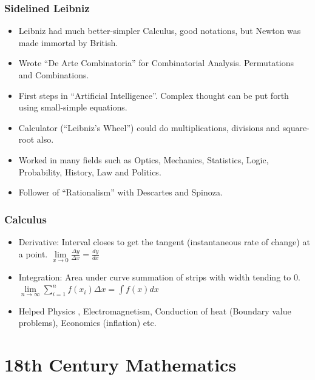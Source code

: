 \begin{frame}[fragile]
\frametitle{Sidelined Leibniz}
\begin{itemize}
\item Leibniz had much better-simpler Calculus, good notations, but Newton was made immortal by British.
\item Wrote ``De Arte Combinatoria'' for Combinatorial Analysis. Permutations and Combinations.
\item First steps in ``Artificial Intelligence''. Complex thought can be put forth using small-simple equations.
\item Calculator (``Leibniz's Wheel'') could do multiplications, divisions and square-root also.
\item Worked in many fields such as Optics, Mechanics, Statistics, Logic, Probability, History, Law and Politics.
\item Follower of ``Rationalism'' with Descartes and Spinoza.
\end{itemize}
\end{frame}

\begin{frame}[fragile]
\frametitle{Calculus}
\begin{itemize}
\item Derivative: Interval closes to get the tangent (instantaneous rate of change) at a point. $\lim \limits_{x \to 0} \frac{\Delta y}{\Delta x} = \frac{dy}{dx}$
\item Integration: Area under curve summation of strips with width tending to 0.
$\lim \limits_{n \to \infty} \sum^n_{i=1} f(x_i)\Delta x = \int f(x) dx$
\item Helped Physics , Electromagnetism, Conduction of heat (Boundary value problems), Economics (inflation) etc.
\end{itemize}
\end{frame}

\section{18th Century Mathematics}

